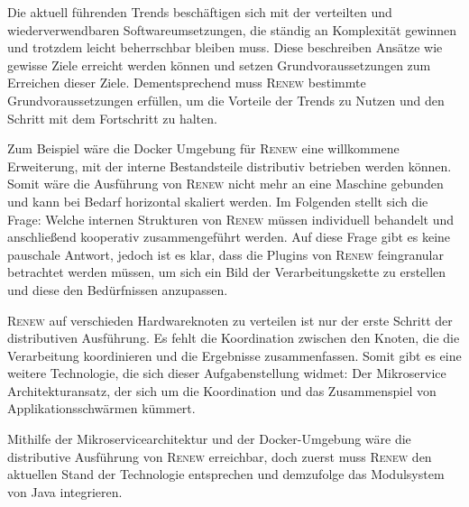 		Die aktuell führenden Trends beschäftigen sich mit der verteilten und wiederverwendbaren Softwareumsetzungen, die ständig an Komplexität gewinnen und trotzdem leicht beherrschbar bleiben muss. Diese beschreiben Ansätze wie gewisse Ziele erreicht werden können und setzen Grundvoraussetzungen zum Erreichen dieser Ziele. Dementsprechend muss \textsc{Renew} bestimmte Grundvoraussetzungen erfüllen, um die Vorteile der Trends zu Nutzen und den Schritt mit dem Fortschritt zu halten.  \bigbreak

		Zum Beispiel wäre die Docker Umgebung für \textsc{Renew} eine willkommene Erweiterung, mit der interne Bestandsteile distributiv betrieben werden können. Somit wäre die Ausführung von \textsc{Renew} nicht mehr an eine Maschine gebunden und kann bei Bedarf horizontal skaliert werden. Im Folgenden stellt sich die Frage: Welche internen Strukturen von \textsc{Renew} müssen individuell behandelt und anschließend kooperativ zusammengeführt werden. Auf diese Frage gibt es keine pauschale Antwort, jedoch ist es klar, dass die Plugins von \textsc{Renew} feingranular betrachtet werden müssen, um sich ein Bild der Verarbeitungskette zu erstellen und diese den Bedürfnissen anzupassen. \bigbreak

		\textsc{Renew} auf verschieden Hardwareknoten zu verteilen ist nur der erste Schritt der distributiven Ausführung. Es fehlt die Koordination zwischen den Knoten, die die Verarbeitung koordinieren und die Ergebnisse zusammenfassen. Somit gibt es eine weitere Technologie, die sich dieser Aufgabenstellung widmet: Der Mikroservice Architekturansatz, der sich um die Koordination und das Zusammenspiel von Applikationsschwärmen kümmert. \bigbreak

		Mithilfe der Mikroservicearchitektur und der Docker-Umgebung wäre die distributive Ausführung von \textsc{Renew} erreichbar, doch zuerst muss \textsc{Renew} den aktuellen Stand der Technologie entsprechen und demzufolge das Modulsystem von Java integrieren.  		
		
